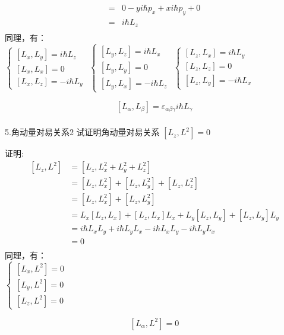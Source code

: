\begin{frame} [allowframebreaks=]
\begin{equation*}
\begin{split}
        =&0-yi\hbar p_x+x i\hbar p_y+0\\
        =&i\hbar L_z\\
    \end{split}  
    \end{equation*}
    同理，有：\\
    $\begin{cases}
        [L_x,L_y]= i\hbar L_z  \\ 
        [L_x,L_x]= 0  \\ 
        [L_x,L_z]= -i\hbar L_y 
    \end{cases}$
    $\begin{cases}
        [L_y,L_z]= i\hbar L_x  \\ 
        [L_y,L_y]= 0  \\ 
        [L_y,L_x]= -i\hbar L_z 
    \end{cases}$
    $\begin{cases}
        [L_z,L_x]= i\hbar L_y  \\ 
        [L_z,L_z]= 0  \\ 
        [L_z,L_y]= -i\hbar L_x 
    \end{cases}$
    \begin{tcolorbox}[colback=yellow!5,colframe=red!75!black,title=角动量对易关系]
        $$ [L_\alpha,L_\beta]= \varepsilon_{\alpha\beta\gamma} i\hbar L_\gamma $$ 
    \end{tcolorbox}
\end{frame} 

\begin{frame} [allowframebreaks=]
    \frametitle{}
    \begin{tcolorbox1}{5.角动量对易关系2}
        试证明角动量对易关系 $[L_z,L^2]=0$
    \end{tcolorbox1}
    \alert{证明:} 
    \begin{equation*}
        \begin{split}
        [L_z,L^2]&= [L_z,L_x ^2+L_y ^2+L_z ^2]\\
        &=[L_z,L_x ^2]+[L_z,L_y ^2]+[L_z,L_z ^2]\\
        &=[L_z,L_x ^2]+[L_z,L_y ^2]\\
        &=L_x[L_z,L_x] +[L_z,L_x]L_x +L_y[L_z,L_y] +[L_z,L_y]L_y\\
        &=i\hbar L_x L_y +i\hbar L_yL_x - i\hbar L_x L_y -i\hbar L_yL_x\\
        &=0 \\
        \end{split}  
    \end{equation*}
    同理，有：\\
    $\begin{cases}
        [L_x,L^2]= 0  \\ 
        [L_y,L^2]= 0  \\ 
        [L_z,L^2]= 0 
    \end{cases}$
    \begin{tcolorbox}[colback=yellow!5,colframe=red!75!black,title=角动量对易关系]
        $$ [L_\alpha,L^2]= 0 $$ 
    \end{tcolorbox}
\end{frame} 

